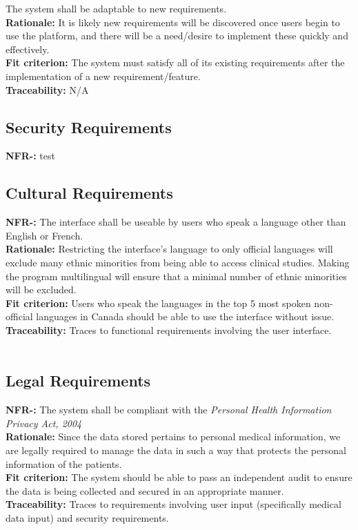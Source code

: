 \documentclass[12pt, titlepage]{article}
\newcounter{NFR_Counter}
\newcounter{FR_Counter}
\begin{document}
The system shall be adaptable to new requirements.\\
\textbf{Rationale:}
It is likely new requirements will be discovered once users begin to use the platform, and there will be a need/desire to 
implement these quickly and effectively.\\
\textbf{Fit criterion:}
The system must satisfy all of its existing requirements after the implementation of a new requirement/feature.\\
\textbf{Traceability:}
N/A
\addtocounter{NFR_Counter}{1}


\subsection{Security Requirements}
\noindent\textbf{NFR-\the\value{NFR_Counter}:}
test
\addtocounter{NFR_Counter}{1}

\subsection{Cultural Requirements}
\noindent\textbf{NFR-\the\value{NFR_Counter}:}
The interface shall be useable by users who speak a language other than English or French.  \\
\textbf{Rationale:}
Restricting the interface's language to only official languages will exclude many ethnic minorities from being able to access clinical studies. Making the program multilingual will ensure that a minimal number of ethnic minorities will be excluded. \\
\textbf{Fit criterion:}
Users who speak the languages in the top 5 most spoken non-official languages in Canada should be able to use the interface without issue. \\
\textbf{Traceability:}
Traces to functional requirements involving the user interface. \\~\\
\addtocounter{NFR_Counter}{1}

\subsection{Legal Requirements}
\noindent\textbf{NFR-\the\value{NFR_Counter}:}
The system shall be compliant with the \textit{Personal Health Information Privacy Act, 2004}  \\
\textbf{Rationale:}
Since the data stored pertains to personal medical information, we are legally required to manage the data in such a way that protects the personal information of the patients. \\
\textbf{Fit criterion:}
The system should be able to pass an independent audit to ensure the data is being collected and secured in an appropriate manner. \\
\textbf{Traceability:}
Traces to requirements involving user input (specifically medical data input) and security requirements. \\~\\
\addtocounter{NFR_Counter}{1}
\end{document}
